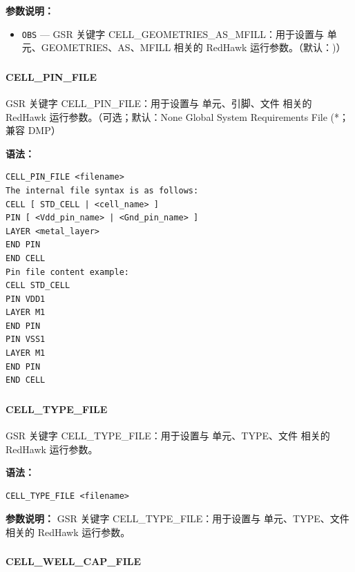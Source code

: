 \textbf{参数说明：}
\begin{itemize}
\item \texttt{OBS} — GSR 关键字 CELL\_GEOMETRIES\_AS\_MFILL：用于设置与 单元、GEOMETRIES、AS、MFILL 相关的 RedHawk 运行参数。（默认：)）
\end{itemize}

\subsubsection{}
\paragraph*{CELL_PIN_FILE}

GSR 关键字 CELL_PIN_FILE：用于设置与 单元、引脚、文件 相关的 RedHawk 运行参数。（可选；默认：None Global System Requirements File (*；兼容 DMP）

\textbf{语法：}
\begin{lstlisting}
CELL_PIN_FILE <filename>
The internal file syntax is as follows:
CELL [ STD_CELL | <cell_name> ]
PIN [ <Vdd_pin_name> | <Gnd_pin_name> ]
LAYER <metal_layer>
END PIN
END CELL
Pin file content example:
CELL STD_CELL
PIN VDD1
LAYER M1
END PIN
PIN VSS1
LAYER M1
END PIN
END CELL
\end{lstlisting}

\subsubsection{}
\paragraph*{CELL_TYPE_FILE}

GSR 关键字 CELL_TYPE_FILE：用于设置与 单元、TYPE、文件 相关的 RedHawk 运行参数。

\textbf{语法：}
\begin{lstlisting}
CELL_TYPE_FILE <filename>
\end{lstlisting}

\textbf{参数说明：}
GSR 关键字 CELL\_TYPE\_FILE：用于设置与 单元、TYPE、文件 相关的 RedHawk 运行参数。

\subsubsection{}
\paragraph*{CELL_WELL_CAP_FILE}

